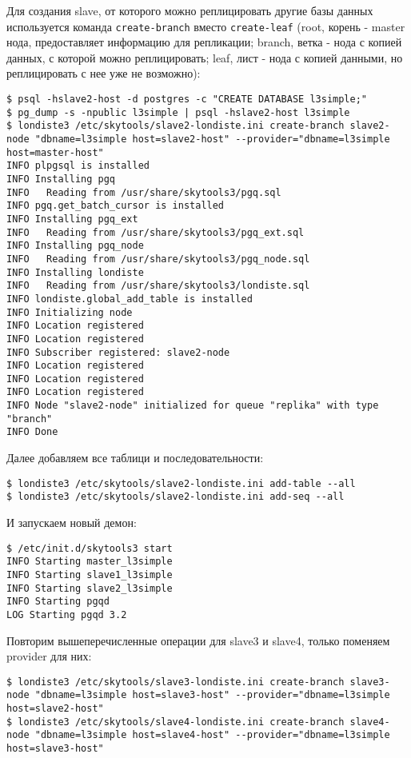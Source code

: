 Для создания slave, от которого можно реплицировать другие базы данных используется команда \lstinline!create-branch! вместо \lstinline!create-leaf! (root, корень - master нода, предоставляет информацию для репликации; branch, ветка - нода с копией данных, с которой можно реплицировать; leaf, лист - нода с копией данными, но реплицировать с нее уже не возможно):

\begin{lstlisting}[label=lst:londiste-cascade2,caption=Инициализируем slave2]
$ psql -hslave2-host -d postgres -c "CREATE DATABASE l3simple;"
$ pg_dump -s -npublic l3simple | psql -hslave2-host l3simple
$ londiste3 /etc/skytools/slave2-londiste.ini create-branch slave2-node "dbname=l3simple host=slave2-host" --provider="dbname=l3simple host=master-host"
INFO plpgsql is installed
INFO Installing pgq
INFO   Reading from /usr/share/skytools3/pgq.sql
INFO pgq.get_batch_cursor is installed
INFO Installing pgq_ext
INFO   Reading from /usr/share/skytools3/pgq_ext.sql
INFO Installing pgq_node
INFO   Reading from /usr/share/skytools3/pgq_node.sql
INFO Installing londiste
INFO   Reading from /usr/share/skytools3/londiste.sql
INFO londiste.global_add_table is installed
INFO Initializing node
INFO Location registered
INFO Location registered
INFO Subscriber registered: slave2-node
INFO Location registered
INFO Location registered
INFO Location registered
INFO Node "slave2-node" initialized for queue "replika" with type "branch"
INFO Done
\end{lstlisting}

Далее добавляем все таблици и последовательности:

\begin{lstlisting}[label=lst:londiste-cascade3,caption=Инициализируем slave2]
$ londiste3 /etc/skytools/slave2-londiste.ini add-table --all
$ londiste3 /etc/skytools/slave2-londiste.ini add-seq --all
\end{lstlisting}

И запускаем новый демон:

\begin{lstlisting}[label=lst:londiste-cascade4,caption=Инициализируем slave2]
$ /etc/init.d/skytools3 start
INFO Starting master_l3simple
INFO Starting slave1_l3simple
INFO Starting slave2_l3simple
INFO Starting pgqd
LOG Starting pgqd 3.2
\end{lstlisting}

Повторим вышеперечисленные операции для slave3 и slave4, только поменяем provider для них:

\begin{lstlisting}[label=lst:londiste-cascade5,caption=Инициализируем slave3 и slave4]
$ londiste3 /etc/skytools/slave3-londiste.ini create-branch slave3-node "dbname=l3simple host=slave3-host" --provider="dbname=l3simple host=slave2-host"
$ londiste3 /etc/skytools/slave4-londiste.ini create-branch slave4-node "dbname=l3simple host=slave4-host" --provider="dbname=l3simple host=slave3-host"
\end{lstlisting}

